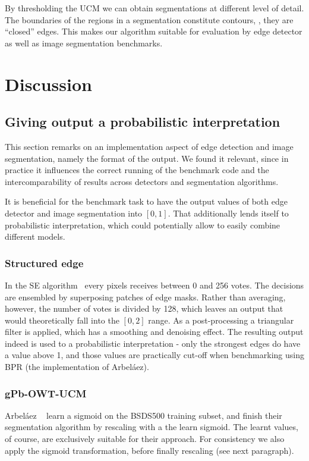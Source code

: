 By thresholding the UCM we can obtain segmentations at different level of detail. The boundaries of the regions in a segmentation constitute contours, \ie, they are ``closed'' edges. This makes our algorithm suitable for evaluation by edge detector as well as image segmentation benchmarks.

\section{Discussion}
\subsection*{Giving output a probabilistic interpretation}
This section remarks on an implementation aspect of edge detection and image segmentation, namely the format of the output. We found it relevant, since in practice it influences the correct running of the benchmark code and the intercomparability %
of results across detectors and segmentation algorithms.

It is beneficial %
for the benchmark task to have the output values of both edge detector and image segmentation into $[0,1]$. That additionally lends itself to probabilistic interpretation, which could potentially allow to easily combine different models.

\subsubsection*{Structured edge}
In the SE algorithm~\cite{DollarICCV13edges,Dollar2015PAMI} every pixels receives between 0 and 256 votes. The decisions are ensembled by superposing patches of edge masks. Rather than averaging, however, the number of votes is divided by 128, which leaves an output that would theoretically fall into the $[0, 2]$ range. As a post-processing a triangular filter is applied, which has a smoothing and denoising effect. The resulting output indeed is used to %
a probabilistic interpretation - only the strongest edges do have a value above 1, and those values are practically cut-off when benchmarking using BPR (the implementation of Arbel\'aez\etal).

\subsubsection*{gPb-OWT-UCM}
Arbel\'aez \etal~\cite{Arbelaez11} learn a sigmoid on the BSDS500 training subset, and finish their segmentation algorithm by rescaling with a the learn sigmoid. The learnt values, of course, are exclusively suitable for their approach. For consistency we also apply the sigmoid transformation, before finally rescaling (see next paragraph).

